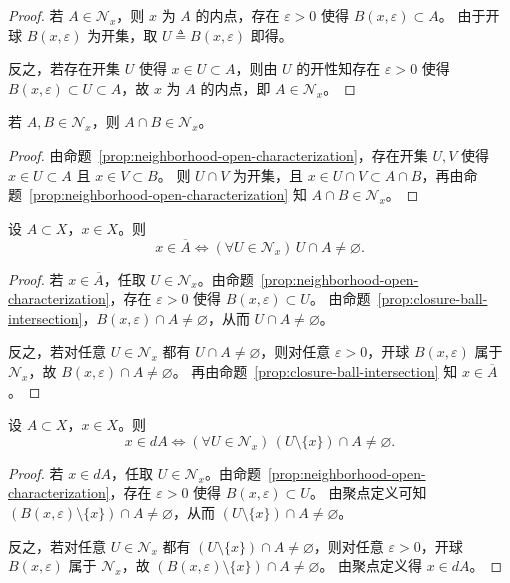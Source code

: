 \documentclass[lang=cn,a4paper,newtx,section]{elegantbook}
\begin{document}
\begin{proof}
  若 $A\in\mathcal{N}_x$，则 $x$ 为 $A$ 的内点，存在 $\varepsilon>0$ 使得 $B(x,\varepsilon)\subset A$。
  由于开球 $B(x,\varepsilon)$ 为开集，取 $U\triangleq B(x,\varepsilon)$ 即得。

  反之，若存在开集 $U$ 使得 $x\in U\subset A$，则由 $U$ 的开性知存在 $\varepsilon>0$ 使得 $B(x,\varepsilon)\subset U\subset A$，故 $x$ 为 $A$ 的内点，即 $A\in\mathcal{N}_x$。
\end{proof}

\begin{proposition}
  若 $A,B\in\mathcal{N}_x$，则 $A\cap B\in\mathcal{N}_x$。
\end{proposition}

\begin{proof}
  由命题~\ref{prop:neighborhood-open-characterization}，存在开集 $U,V$ 使得 $x\in U\subset A$ 且 $x\in V\subset B$。
  则 $U\cap V$ 为开集，且 $x\in U\cap V\subset A\cap B$，再由命题~\ref{prop:neighborhood-open-characterization} 知 $A\cap B\in\mathcal{N}_x$。
\end{proof}

\begin{proposition}
  设 $A\subset X$，$x\in X$。则
  \[
    x\in\overline{A}\iff (\forall U\in\mathcal{N}_x)\,U\cap A\ne\varnothing.
  \]
\end{proposition}

\begin{proof}
  若 $x\in\overline{A}$，任取 $U\in\mathcal{N}_x$。由命题~\ref{prop:neighborhood-open-characterization}，存在 $\varepsilon>0$ 使得 $B(x,\varepsilon)\subset U$。
  由命题~\ref{prop:closure-ball-intersection}，$B(x,\varepsilon)\cap A\ne\varnothing$，从而 $U\cap A\ne\varnothing$。

  反之，若对任意 $U\in\mathcal{N}_x$ 都有 $U\cap A\ne\varnothing$，则对任意 $\varepsilon>0$，开球 $B(x,\varepsilon)$ 属于 $\mathcal{N}_x$，故 $B(x,\varepsilon)\cap A\ne\varnothing$。
  再由命题~\ref{prop:closure-ball-intersection} 知 $x\in\overline{A}$。
\end{proof}

\begin{proposition}
  设 $A\subset X$，$x\in X$。则
  \[
    x\in dA\iff (\forall U\in\mathcal{N}_x)\,(U\setminus\{x\})\cap A\ne\varnothing.
  \]
\end{proposition}

\begin{proof}
  若 $x\in dA$，任取 $U\in\mathcal{N}_x$。由命题~\ref{prop:neighborhood-open-characterization}，存在 $\varepsilon>0$ 使得 $B(x,\varepsilon)\subset U$。
  由聚点定义可知 $(B(x,\varepsilon)\setminus\{x\})\cap A\ne\varnothing$，从而 $(U\setminus\{x\})\cap A\ne\varnothing$。

  反之，若对任意 $U\in\mathcal{N}_x$ 都有 $(U\setminus\{x\})\cap A\ne\varnothing$，则对任意 $\varepsilon>0$，开球 $B(x,\varepsilon)$ 属于 $\mathcal{N}_x$，故 $(B(x,\varepsilon)\setminus\{x\})\cap A\ne\varnothing$。
  由聚点定义得 $x\in dA$。
\end{proof}
\end{document}
